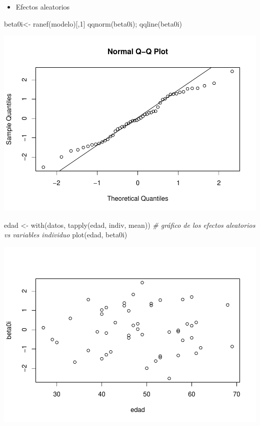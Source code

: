 \documentclass[
]{book}
\newenvironment{Shaded}{\begin{snugshade}}{\end{snugshade}}
\newcommand{\CommentTok}[1]{\textcolor[rgb]{0.56,0.35,0.01}{\textit{#1}}}
\newcommand{\DecValTok}[1]{\textcolor[rgb]{0.00,0.00,0.81}{#1}}
\newcommand{\FunctionTok}[1]{\textcolor[rgb]{0.00,0.00,0.00}{#1}}
\newcommand{\NormalTok}[1]{#1}
\newcommand{\OtherTok}[1]{\textcolor[rgb]{0.56,0.35,0.01}{#1}}
\providecommand{\tightlist}{%
  \setlength{\itemsep}{0pt}\setlength{\parskip}{0pt}}
\begin{document}
\begin{itemize}
\tightlist
\item
  Efectos aleatorios
\end{itemize}

\begin{Shaded}
\begin{Highlighting}[]
\NormalTok{beta0i}\OtherTok{\textless{}{-}} \FunctionTok{ranef}\NormalTok{(modelo)[,}\DecValTok{1}\NormalTok{]}
\FunctionTok{qqnorm}\NormalTok{(beta0i); }\FunctionTok{qqline}\NormalTok{(beta0i)}
\end{Highlighting}
\end{Shaded}

\includegraphics{fig_out/unnamed-chunk-130-1.pdf}

\begin{Shaded}
\begin{Highlighting}[]
\NormalTok{edad }\OtherTok{\textless{}{-}} \FunctionTok{with}\NormalTok{(datos, }\FunctionTok{tapply}\NormalTok{(edad, indiv, mean))}
\CommentTok{\# gráfico de los efectos aleatorios vs variables individuo}
\FunctionTok{plot}\NormalTok{(edad, beta0i)}
\end{Highlighting}
\end{Shaded}

\includegraphics{fig_out/unnamed-chunk-130-2.pdf}
\end{document}
